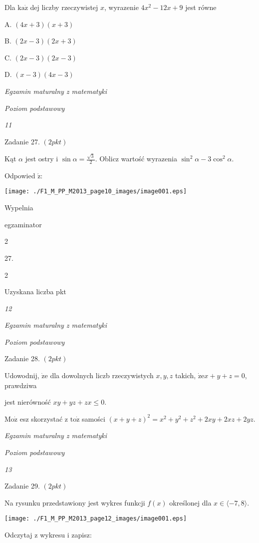 \documentclass[a4paper,12pt]{article}
\begin{document}
Dla $\mathrm{k}\mathrm{a}\dot{\mathrm{z}}$ dej liczby rzeczywistej $x$, wyrazenie $4x^{2}-12x+9$ jest równe

A. $(4x+3)(x+3)$

B. $(2x-3)(2x+3)$

C. $(2x-3)(2x-3)$

D. $(x-3)(4x-3)$





{\it Egzamin maturalny z matematyki}

{\it Poziom podstawowy}

{\it 11}

Zadanie 27. $(2pkt)$

Kąt $\alpha$ jest ostry i $\displaystyle \sin\alpha=\frac{\sqrt{3}}{2}$. Oblicz wartość wyrazenia $\sin^{2}\alpha-3\cos^{2}\alpha.$

Odpowied $\acute{\mathrm{z}}$:
\begin{center}
\texttt{[image: ./F1\_M\_PP\_M2013\_page10\_images/image001.eps]}
\end{center}
Wypelnia

egzaminator

2

27.

2

Uzyskana liczba pkt





{\it 12}

{\it Egzamin maturalny z matematyki}

{\it Poziom podstawowy}

Zadanie 28. $(2pkt)$

Udowodnij, $\dot{\mathrm{z}}\mathrm{e}$ dla dowolnych liczb rzeczywistych $x, y, z$ takich, $\dot{\mathrm{z}}\mathrm{e}x+y+z=0$, prawdziwa

jest nierówność $xy+yz+zx\leq 0.$

$\mathrm{M}\mathrm{o}\dot{\mathrm{z}}$ esz skorzystać z $\mathrm{t}\mathrm{o}\dot{\mathrm{z}}$ samości $(x+y+z)^{2}=x^{2}+y^{2}+z^{2}+2xy+2xz+2yz.$





{\it Egzamin maturalny z matematyki}

{\it Poziom podstawowy}

{\it 13}

Zadanie 29. $(2pkt)$

Na rysunku przedstawiony jest wykres funkcji $f(x)$ określonej dla $x\in\langle-7,8\rangle.$
\begin{center}
\texttt{[image: ./F1\_M\_PP\_M2013\_page12\_images/image001.eps]}
\end{center}
Odczytaj z wykresu i zapisz:
\end{document}
